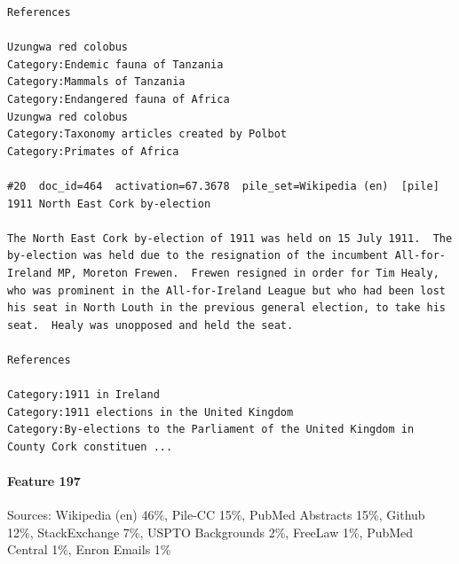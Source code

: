 \begin{verbatim}
References

Uzungwa red colobus
Category:Endemic fauna of Tanzania
Category:Mammals of Tanzania
Category:Endangered fauna of Africa
Uzungwa red colobus
Category:Taxonomy articles created by Polbot
Category:Primates of Africa

#20  doc_id=464  activation=67.3678  pile_set=Wikipedia (en)  [pile]
1911 North East Cork by-election

The North East Cork by-election of 1911 was held on 15 July 1911.  The by-election was held due to the resignation of the incumbent All-for-Ireland MP, Moreton Frewen.  Frewen resigned in order for Tim Healy, who was prominent in the All-for-Ireland League but who had been lost his seat in North Louth in the previous general election, to take his seat.  Healy was unopposed and held the seat.

References

Category:1911 in Ireland
Category:1911 elections in the United Kingdom
Category:By-elections to the Parliament of the United Kingdom in County Cork constituen ...

\end{verbatim}

\paragraph*{Feature 197} Sources: Wikipedia (en) 46\%, Pile-CC 15\%, PubMed Abstracts 15\%, Github 12\%, StackExchange 7\%, USPTO Backgrounds 2\%, FreeLaw 1\%, PubMed Central 1\%, Enron Emails 1\%

